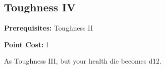 \subsection*{Toughness IV}\label{feat:toughness4}

\noindent
\textbf{Prerequisites:} Toughness II

\noindent
\textbf{Point Cost:} 1 

As Toughness III, but your health die becomes d12.
